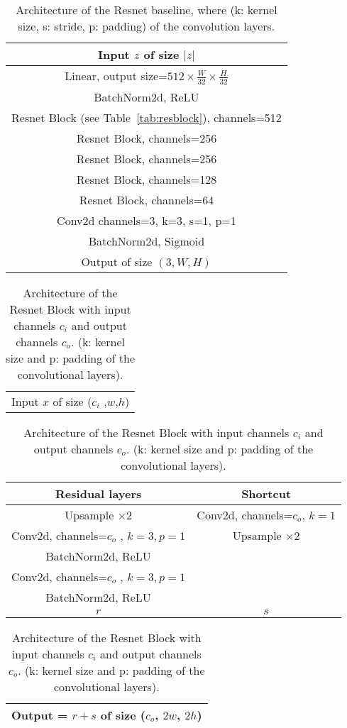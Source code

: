 \documentclass[10pt,twocolumn,letterpaper]{article}
\begin{document}
\begin{table}[ht]
	\caption{\label{tab:resnet} Architecture of the Resnet baseline, where (k: kernel size, s: stride, p: padding) of the convolution layers.}
   	\centering
   	\begin{tabular}{c}
		\toprule
	 	Input $z$ of size $|z|$ \\
       	\midrule
        Linear, output size=$512 \times \frac{W}{32} \times \frac{H}{32} $ \\
        BatchNorm2d, ReLU \\
        \midrule
        Resnet Block (see Table~\ref{tab:resblock}), channels=512 \\
		\midrule
		Resnet Block, channels=256 \\
        \midrule
        Resnet Block, channels=256 \\
        \midrule
        Resnet Block, channels=128 \\
		\midrule
		Resnet Block, channels=64 \\
        \midrule
        Conv2d channels=3, k=3, s=1, p=1 \\
        BatchNorm2d, Sigmoid \\
        \midrule
        Output of size  $(3,W,H)$ \\
		\bottomrule
	\end{tabular}
\end{table}\begin{table}[ht]
	\caption{\label{tab:resblock} Architecture of the Resnet Block with input channels $c_i$ and output channels $c_o$. (k: kernel size and p: padding of the convolutional layers).}
   	\centering
   	\begin{tabular}{c}
		\toprule
	 	Input $x$ of size ($c_i$ ,$w$,$h$) \\
	\end{tabular}
   	\begin{tabular}{c|c}
   	    \midrule
   	    \textbf{Residual layers} &  \textbf{Shortcut}\\
        \midrule
            Upsample  $\times 2$ & Conv2d, channels=$c_o$, $k=1$ \\
            Conv2d, channels=$c_o$ , $k=3, p=1$ & Upsample  $\times 2$\\
            BatchNorm2d, ReLU & \\
            Conv2d,  channels=$c_o$ , $k=3, p=1$ & \\
            BatchNorm2d, ReLU & \\
        \midrule
        $r$ & $s$ \\
        \midrule
	\end{tabular}
	\begin{tabular}{c}
		Output = $r+s$ of size ($c_o$, $2w$, $2h$) \\
		\bottomrule
	\end{tabular}
	\label{resnet_block}
\end{table}%
\end{document}
